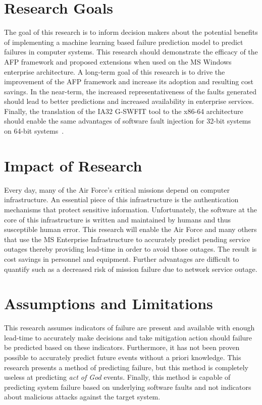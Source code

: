 \section{Research Goals} 
The goal of this research is to inform decision makers about the potential
benefits of implementing a machine learning based failure prediction model to
predict failures in computer systems.  This research should demonstrate the
efficacy of the \ac{AFP} framework and proposed extensions when used on the
\ac{MS} Windows enterprise architecture.  A long-term goal of this research
is to drive the improvement of the \ac{AFP} framework and increase its adoption
and resulting cost savings.  In the near-term, the increased representativeness
of the faults generated should lead to better predictions and increased
availability in enterprise services.  Finally, the translation of the IA32
\ac{G-SWFIT} tool to the x86-64 architecture should enable the same advantages
of software fault injection for 32-bit systems on 64-bit systems~\cite{gswfit}.

\section{Impact of Research}
Every day, many of the Air Force's critical missions depend on computer
infrastructure.  An essential piece of this infrastructure is the
authentication mechanisms that protect  sensitive information.  Unfortunately,
the software at the core of this infrastructure is written and maintained by
humans and thus susceptible human error.  This research will enable the Air
Force and many others that use the \ac{MS} Enterprise Infrastructure to
accurately predict pending service outages thereby providing lead-time in order
to avoid those outages.  The result is cost savings in personnel and equipment.
Further advantages are difficult to quantify such as a decreased risk of
mission failure due to network service outage.

\section{Assumptions and Limitations}
This research assumes indicators of failure are present and available with
enough lead-time to accurately make decisions and take mitigation action should
failure be predicted based on these indicators.  Furthermore, it has not been
proven possible to accurately predict future events without a priori knowledge.
This research presents a method of predicting failure, but this method is
completely useless at predicting \emph{act of God} events.  Finally, this
method is capable of predicting system failure based on underlying software
faults and not indicators about malicious attacks against the target system.

